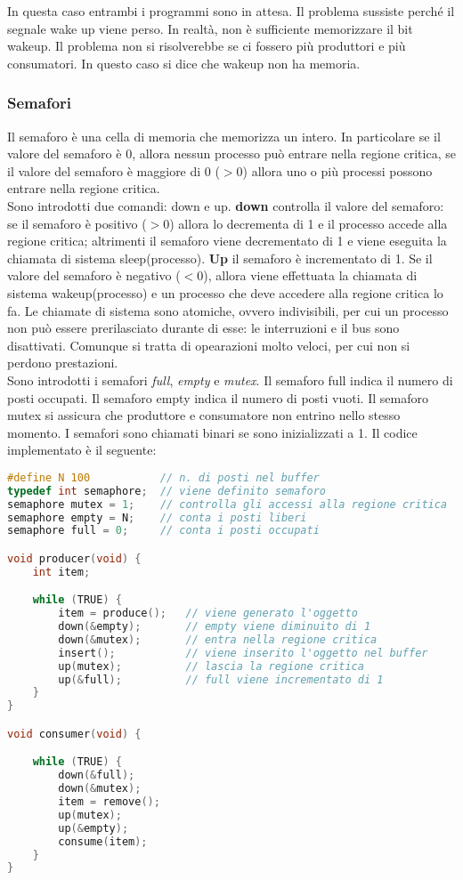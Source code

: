 \documentclass{article}
\begin{document}
In questa caso entrambi i programmi sono in attesa. Il problema sussiste perché il segnale wake up viene perso. In realtà, non è sufficiente memorizzare il bit wakeup. Il problema non si risolverebbe se ci fossero più produttori e più consumatori. In questo caso si dice che wakeup non ha memoria.

\subsubsection{Semafori}
Il semaforo è una cella di memoria che memorizza un intero. In particolare se il valore del semaforo è 0, allora nessun processo può entrare nella regione critica, se il valore del semaforo è maggiore di 0 ($>0$) allora uno o più processi possono entrare nella regione critica.\\
Sono introdotti due comandi: down e up. \textbf{down} controlla il valore del semaforo: se il semaforo è positivo ($>0$) allora lo decrementa di 1 e il processo accede alla regione critica; altrimenti il semaforo viene decrementato di 1 e viene eseguita la chiamata di sistema sleep(processo). \textbf{Up} il semaforo è incrementato di 1. Se il valore del semaforo è negativo ($<0$), allora viene effettuata la chiamata di sistema wakeup(processo) e un processo che deve accedere alla regione critica lo fa. Le chiamate di sistema sono atomiche, ovvero indivisibili, per cui un processo non può essere prerilasciato durante di esse: le interruzioni e il bus sono disattivati. Comunque si tratta di opearazioni molto veloci, per cui non si perdono prestazioni.\\

Sono introdotti i semafori \textit{full}, \textit{empty} e \textit{mutex}. Il semaforo full indica il numero di posti occupati. Il semaforo empty indica il numero di posti vuoti. Il semaforo mutex si assicura che produttore e consumatore non entrino nello stesso momento. I semafori sono chiamati binari se sono inizializzati a 1. Il codice implementato è il seguente:
\begin{lstlisting}[language=C]
#define N 100           // n. di posti nel buffer
typedef int semaphore;  // viene definito semaforo
semaphore mutex = 1;    // controlla gli accessi alla regione critica
semaphore empty = N;    // conta i posti liberi
semaphore full = 0;     // conta i posti occupati

void producer(void) {
	int item;

	while (TRUE) {
		item = produce();   // viene generato l'oggetto
		down(&empty);       // empty viene diminuito di 1
		down(&mutex);       // entra nella regione critica
		insert();           // viene inserito l'oggetto nel buffer
		up(mutex);          // lascia la regione critica
		up(&full);          // full viene incrementato di 1
	}
}

void consumer(void) {

	while (TRUE) {
		down(&full);
		down(&mutex);
		item = remove();
		up(mutex);
		up(&empty);
		consume(item);
	}
}
\end{lstlisting}
\end{document}
